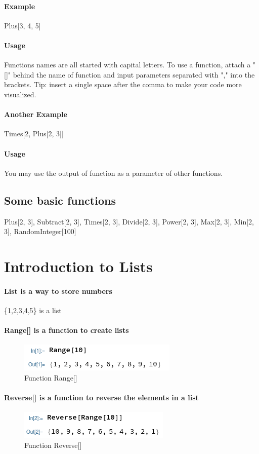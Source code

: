\documentclass{article}
\begin{document}
			\paragraph{Example}
				Plus[3, 4, 5] 
			\paragraph{Usage}
				Functions names are all started with capital letters. To use a function, attach a "[]" behind the name of function and input parameters separated with "," into the brackets. Tip: insert a single space after the comma to make your code more visualized.
			\paragraph{Another Example}
				Times[2, Plus[2, 3]]
			\paragraph{Usage}
				You may use the output of function as a parameter of other functions.
			\subsection{Some basic functions}
				Plus[2, 3],
				Subtract[2, 3],
				Times[2, 3],
				Divide[2, 3],
				Power[2, 3],
				Max[2, 3],
				Min[2, 3],
				RandomInteger[100]
		\section{Introduction to Lists}
			\paragraph{List is a way to store numbers} \{1,2,3,4,5\} is a list
			\paragraph{Range[] is a function to create lists}
			\begin{figure}[h!]
				\centering
				\includegraphics[width=0.7\linewidth]{pics/Range}
				\caption{Function Range[]}
				\label{fig:range}
			\end{figure}
			\paragraph{Reverse[] is a function to reverse the elements in a list}
			\begin{figure}[h!]
				\centering
				\includegraphics[width=0.7\linewidth]{pics/Reverse}
				\caption{Function Reverse[]}
				\label{fig:reverse}
			\end{figure}
\end{document}
